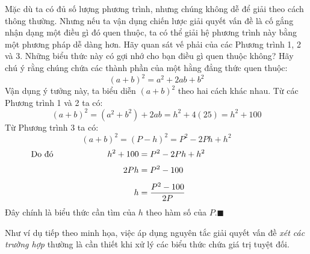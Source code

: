 \begin{minipage}[t]{0.70\textwidth}
    Mặc dù ta có đủ số lượng phương trình, nhưng chúng không dễ để giải theo cách thông thường. Nhưng nếu ta vận dụng chiến lược giải quyết vấn đề là cố gắng nhận dạng một điều gì đó quen thuộc, ta có thể giải hệ phương trình này bằng một phương pháp dễ dàng hơn. Hãy quan sát vế phải của các Phương trình 1, 2 và 3. Những biểu thức này có gợi nhớ cho bạn điều gì quen thuộc không? Hãy chú ý rằng chúng chứa các thành phần của một hằng đẳng thức quen thuộc:
    \[
    (a + b)^2 = a^2 + 2ab + b^2
    \]
    Vận dụng ý tưởng này, ta biểu diễn $(a + b)^2$ theo hai cách khác nhau. Từ các Phương trình 1 và 2 ta có:
    \[
    (a + b)^2 = (a^2 + b^2) + 2ab = h^2 + 4(25) = h^2 + 100
    \]
    Từ Phương trình 3 ta có:
    \[
    (a + b)^2 = (P - h)^2 = P^2 - 2Ph + h^2
    \]
    \begin{align*}
        \text{\makebox[0pt][l]{\hspace{-3.2cm}Do đó}} h^2 + 100 &= P^2 - 2Ph + h^2 \\[1mm]
        2Ph &= P^2 - 100 \\[1.5mm]
        h &= \frac{P^2 - 100}{2P}
    \end{align*}
    Đây chính là biểu thức cần tìm của $h$ theo hàm số của $P$.\hfill{\color{stewartcyan}$\blacksquare$}

    \bigskip
    Như ví dụ tiếp theo minh họa, việc áp dụng nguyên tắc giải quyết vấn đề \emph{xét các trường hợp} thường là cần thiết khi xử lý các biểu thức chứa giá trị tuyệt đối.
\end{minipage}